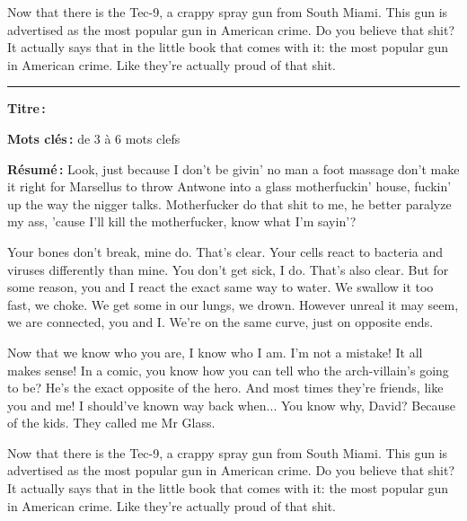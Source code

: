 {\begin{titlepage}
\begin{minipage}{\textwidth}
\begin{multicols}{2}
Now that there is the Tec-9, a crappy spray gun from South Miami. This gun is advertised as the most popular gun in American crime. Do you believe that shit? It actually says that in the little book that comes with it: the most popular gun in American crime. Like they're actually proud of that shit.
\end{multicols}
\end{minipage}
\vfill
{\color{rulepink}\rule{\textwidth}{0.2cm}}

\bigskip

\begin{minipage}{\textwidth}
{\color{textpink} \textbf{Titre\,:}}~~\@title

\bigskip

\textbf{Mots clés\,:} de 3 à 6 mots clefs
\begin{multicols}{2}
\textbf{Résumé\,:}
Look, just because I don't be givin' no man a foot massage don't make it right for Marsellus to throw Antwone into a glass motherfuckin' house, fuckin' up the way the nigger talks. Motherfucker do that shit to me, he better paralyze my ass, 'cause I'll kill the motherfucker, know what I'm sayin'?

Your bones don't break, mine do. That's clear. Your cells react to bacteria and viruses differently than mine. You don't get sick, I do. That's also clear. But for some reason, you and I react the exact same way to water. We swallow it too fast, we choke. We get some in our lungs, we drown. However unreal it may seem, we are connected, you and I. We're on the same curve, just on opposite ends.

Now that we know who you are, I know who I am. I'm not a mistake! It all makes sense! In a comic, you know how you can tell who the arch-villain's going to be? He's the exact opposite of the hero. And most times they're friends, like you and me! I should've known way back when... You know why, David? Because of the kids. They called me Mr Glass.

Now that there is the Tec-9, a crappy spray gun from South Miami. This gun is advertised as the most popular gun in American crime. Do you believe that shit? It actually says that in the little book that comes with it: the most popular gun in American crime. Like they're actually proud of that shit.
\end{multicols}
\end{minipage}
\end{titlepage}

\restoregeometry
}
\makeatother
